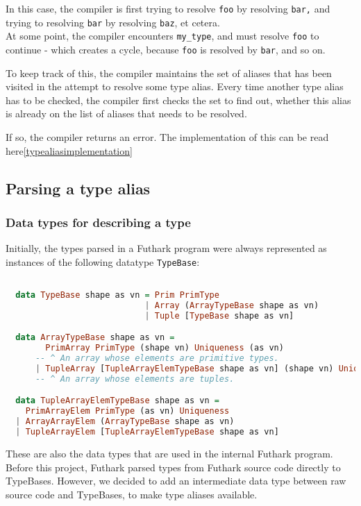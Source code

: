 \begin{enumerate}
    In this case, the compiler is first trying to resolve \texttt{foo} by
    resolving \texttt{bar,} and trying to resolving \texttt{bar} by resolving \texttt{baz}, et cetera. \\
    At some point, the compiler encounters \texttt{my\_type}, and must resolve \texttt{foo} to
    continue - which creates a cycle, because \texttt{foo} is resolved by \texttt{bar}, and so on.

    To keep track of this, the compiler maintains the set of aliases that has
    been visited in the attempt to resolve some type alias. Every time another
    type alias has to be checked, the compiler first checks the set to find out,
    whether this alias is already on the list of aliases that needs to be
    resolved.

    If so, the compiler returns an error.
    The implementation of this can be read here\ref{typealiasimplementation}
\end{enumerate}
\subsection{Parsing a type alias}
\subsubsection{Data types for describing a type}
Initially, the types parsed in a Futhark program were always represented as instances of the
following datatype \texttt{TypeBase}:
\begin{lstlisting}[language=Haskell]

  data TypeBase shape as vn = Prim PrimType
                            | Array (ArrayTypeBase shape as vn)
                            | Tuple [TypeBase shape as vn]

  data ArrayTypeBase shape as vn =
        PrimArray PrimType (shape vn) Uniqueness (as vn)
      -- ^ An array whose elements are primitive types.
      | TupleArray [TupleArrayElemTypeBase shape as vn] (shape vn) Uniqueness
      -- ^ An array whose elements are tuples.

  data TupleArrayElemTypeBase shape as vn =
    PrimArrayElem PrimType (as vn) Uniqueness
  | ArrayArrayElem (ArrayTypeBase shape as vn)
  | TupleArrayElem [TupleArrayElemTypeBase shape as vn]
\end{lstlisting}
\noindent
These are also the data types that are used in the internal Futhark program.
\\
Before this project, Futhark parsed types from Futhark source code directly to
TypeBases.
However, we decided to add an intermediate data type between raw source
code and TypeBases, to make type aliases available.

